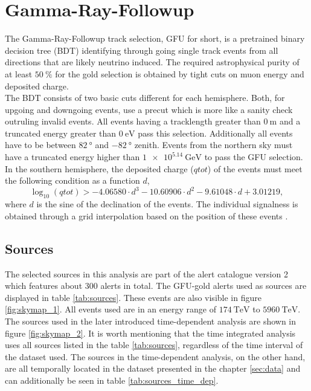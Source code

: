 \section{Gamma-Ray-Followup}

The Gamma-Ray-Followup track selection, GFU for short, is a pretrained binary decision tree (BDT) identifying through going single track events from all directions that are likely neutrino induced.
The required astrophysical purity of at least $\SI{50}{\percent}$ for the gold selection is obtained by tight cuts on muon energy and deposited charge.\\
The BDT consists of two basic cuts different for each hemisphere.
Both, for upgoing and downgoing events, use a precut which is more like a sanity check outruling invalid events.
All events having a tracklength greater than $\SI{0}{\meter}$ and a truncated energy greater than $\SI{0}{\electronvolt}$ pass this selection.
Additionally all events have to be between $\SI{82}{\degree}$ and $\SI{-82}{\degree}$ zenith.
Events from the northern sky must have a truncated energy higher than $\SI{1e5.14}{\giga\electronvolt}$ to pass the GFU selection.
In the southern hemisphere, the deposited charge ($qtot$) of the events must meet the following condition as a function $d$,
\begin{equation}
  \log_{10}(qtot) > -4.06580\cdot d^3 - 10.60906\cdot d^2  -9.61048\cdot d + 3.01219,
\end{equation}
where $d$ is the sine of the declination of the events.
The individual signalness is obtained through a grid interpolation based on the position of these events \cite{source_tba}.

\subsection{Sources}

The selected sources in this analysis are part of the alert catalogue version 2 which features about 300 alerts in total.
The GFU-gold alerts used as sources are displayed in table \ref{tab:sources}.
These events are also visible in figure \ref{fig:skymap_1}.
All events used are in an energy range of $\SI{174}{\tera\electronvolt}$ to $\SI{5960}{\tera\electronvolt}$.
The sources used in the later introduced time-dependent analysis are shown in figure \ref{fig:skymap_2}.
It is worth mentioning that the time integrated analysis uses all sources listed in the table \ref{tab:sources}, regardless of the time interval of the dataset used.
The sources in the time-dependent analysis, on the other hand, are all temporally located in the dataset presented in the chapter \ref{sec:data} and can additionally be seen in table \ref{tab:sources_time_dep}.

